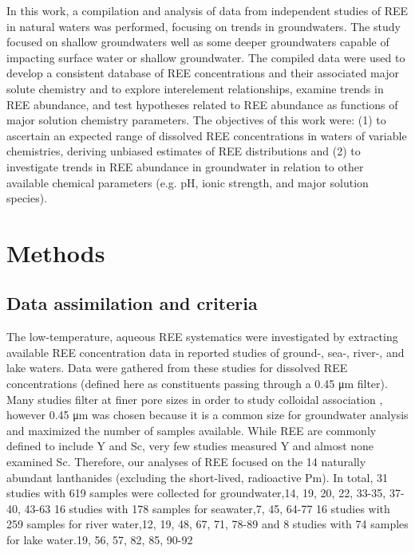 In this work, a compilation and analysis of data from independent studies of REE in natural waters was performed, focusing on trends in groundwaters.
The study focused on shallow groundwaters well as some deeper groundwaters capable of impacting surface water or shallow groundwater.
The compiled data were used to develop a consistent database of REE concentrations and their associated major solute chemistry and to explore interelement relationships, examine trends in REE abundance, and test hypotheses related to REE abundance as functions of major solution chemistry parameters.
The objectives of this work were: (1) to ascertain an expected range of dissolved REE concentrations in waters of variable chemistries, deriving unbiased estimates of REE distributions and (2) to investigate trends in REE abundance in groundwater in relation to other available chemical parameters (e.g. pH, ionic strength, and major solution species).

\section{Methods}

\subsection{Data assimilation and criteria}

The low-temperature, aqueous REE systematics were investigated by extracting available REE concentration data in reported studies of ground-, sea-, river-, and lake waters.
Data were gathered from these studies for dissolved REE concentrations (defined here as constituents passing through a 0.45 \si{\um} filter). 
Many studies filter at finer pore sizes in order to study colloidal association \citep{Dia_GCA_2000, Pourret_JCIS_2007, Stolpe_GCA_2013},
however 0.45 \si{\um} was chosen because it is a common size for groundwater analysis and  maximized the number of samples available.
While REE are commonly defined to include Y and Sc, very few studies measured Y and almost none examined Sc.
Therefore, our analyses of REE focused on the 14 naturally abundant lanthanides (excluding the short-lived, radioactive Pm).
In total, 31 studies with 619 samples were collected for groundwater,14, 19, 20, 22, 33-35, 37-40, 43-63
16 studies with 178 samples for seawater,7, 45, 64-77
16 studies with 259 samples for river water,12, 19, 48, 67, 71, 78-89
and 8 studies with 74 samples for lake water.19, 56, 57, 82, 85, 90-92

